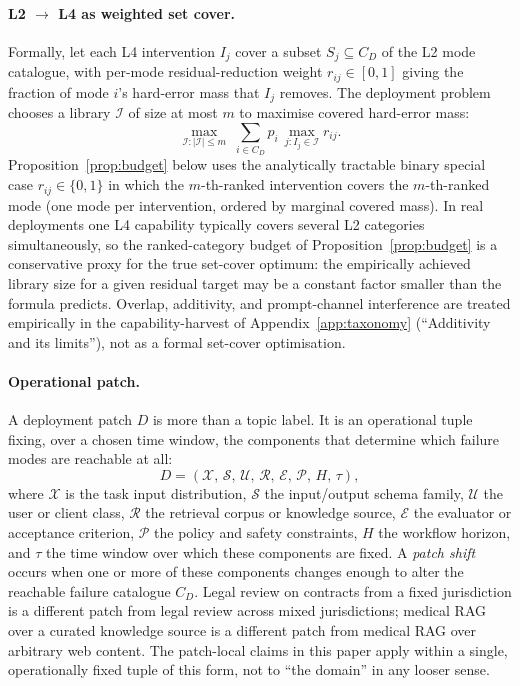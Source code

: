 \documentclass{article}
\theoremstyle{taeplain}
\theoremstyle{taedefn}
\begin{document}
\paragraph{L2 $\to$ L4 as weighted set cover.}
Formally, let each L4 intervention $I_j$ cover a subset $S_j \subseteq C_D$ of the L2 mode catalogue, with per-mode residual-reduction weight $r_{ij} \in [0, 1]$ giving the fraction of mode $i$'s hard-error mass that $I_j$ removes. The deployment problem chooses a library $\mathcal{I}$ of size at most $m$ to maximise covered hard-error mass:
\[
\max_{\mathcal{I} : |\mathcal{I}| \leq m}\; \sum_{i \in C_D} p_i \, \max_{j : I_j \in \mathcal{I}} r_{ij}.
\]
Proposition~\ref{prop:budget} below uses the analytically tractable binary special case $r_{ij} \in \{0, 1\}$ in which the $m$-th-ranked intervention covers the $m$-th-ranked mode (one mode per intervention, ordered by marginal covered mass). In real deployments one L4 capability typically covers several L2 categories simultaneously, so the ranked-category budget of Proposition~\ref{prop:budget} is a conservative proxy for the true set-cover optimum: the empirically achieved library size for a given residual target may be a constant factor smaller than the formula predicts. Overlap, additivity, and prompt-channel interference are treated empirically in the capability-harvest of Appendix~\ref{app:taxonomy} (``Additivity and its limits''), not as a formal set-cover optimisation.

\paragraph{Operational patch.}
A deployment patch $D$ is more than a topic label. It is an operational tuple fixing, over a chosen time window, the components that determine which failure modes are reachable at all:
\[
D = (\mathcal{X},\, \mathcal{S},\, \mathcal{U},\, \mathcal{R},\, \mathcal{E},\, \mathcal{P},\, H,\, \tau),
\]
where $\mathcal{X}$ is the task input distribution, $\mathcal{S}$ the input/output schema family, $\mathcal{U}$ the user or client class, $\mathcal{R}$ the retrieval corpus or knowledge source, $\mathcal{E}$ the evaluator or acceptance criterion, $\mathcal{P}$ the policy and safety constraints, $H$ the workflow horizon, and $\tau$ the time window over which these components are fixed. A \emph{patch shift} occurs when one or more of these components changes enough to alter the reachable failure catalogue $C_D$. Legal review on contracts from a fixed jurisdiction is a different patch from legal review across mixed jurisdictions; medical RAG over a curated knowledge source is a different patch from medical RAG over arbitrary web content. The patch-local claims in this paper apply within a single, operationally fixed tuple of this form, not to ``the domain'' in any looser sense.
\end{document}
